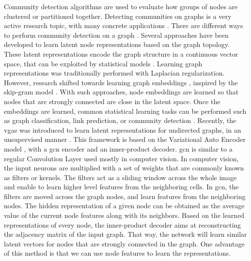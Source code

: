 Community detection algorithms are used to evaluate how groups of nodes are
clustered or partitioned together. Detecting communities on graphs is a very
active research topic, with many concrete applications
\cite{fortunato_community_2010}. There are different ways to perform community
detection on a graph \cite{hamilton_representation_2018}. Several approaches
have been developed to learn latent node representations based on the graph
topology. These latent representations encode the graph structure in a
continuous vector space, that can be exploited by statistical models
\cite{perozzi_deepwalk_2014}. Learning graph representations was traditionally
performed with Laplacian regularization. However, research shifted towards
learning graph embeddings \cite{kipf_semi-supervised_2017}, inspired by the
skip-gram model \cite{mikolov_distributed_2013}. With such approaches, node
embeddings are learned so that nodes that are strongly connected are close in
the latent space. Once the embeddings are learned, common statistical learning
tasks can be performed such as graph classification, link prediction, or
community detection \cite{hamilton_representation_2018}. Recently, the \ac{vgae}
was introduced to learn latent representations for undirected graphs, in an
unsupervised manner \cite{kipf_variational_2016}. This framework is based on the
Variational Auto Encoder model \cite{kingma_auto-encoding_2014}, with a \ac{gcn}
\cite{kipf_semi-supervised_2017} encoder and an inner-product decoder. \ac{gcn}
is similar to a regular Convolution Layer used mostly in computer vision. In
computer vision, the input neurons are multiplied with a set of weights that are
commonly known as filters or kernels. The filters act as a sliding window across
the whole image and enable to learn higher level features from the neighboring
cells. In \ac{gcn}, the filters are moved across the graph nodes, and learn
features from the neighboring nodes. The hidden representation of a given node
can be obtained as the average value of the current node features along with its
neighbors. Based on the learned representations of every node, the inner-product
decoder aims at reconstructing the adjacency matrix of the input graph. That
way, the network will learn similar latent vectors for nodes that are strongly
connected in the graph. One advantage of this method is that we can use node
features to learn the representations.

